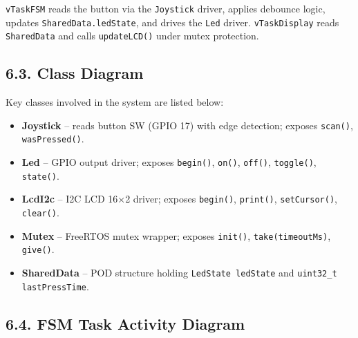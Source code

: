 \documentclass[12pt]{article}
\begin{document}
\texttt{vTaskFSM} reads the button via the \texttt{Joystick} driver, applies debounce logic, updates \texttt{SharedData.ledState}, and drives the \texttt{Led} driver. \texttt{vTaskDisplay} reads \texttt{SharedData} and calls \texttt{updateLCD()} under mutex protection.

\subsection*{6.3. Class Diagram}

Key classes involved in the system are listed below:

\begin{itemize}
    \item \textbf{Joystick} – reads button SW (GPIO 17) with edge detection; exposes \texttt{scan()}, \texttt{wasPressed()}.
    \item \textbf{Led} – GPIO output driver; exposes \texttt{begin()}, \texttt{on()}, \texttt{off()}, \texttt{toggle()}, \texttt{state()}.
    \item \textbf{LcdI2c} – I2C LCD 16×2 driver; exposes \texttt{begin()}, \texttt{print()}, \texttt{setCursor()}, \texttt{clear()}.
    \item \textbf{Mutex} – FreeRTOS mutex wrapper; exposes \texttt{init()}, \texttt{take(timeoutMs)}, \texttt{give()}.
    \item \textbf{SharedData} – POD structure holding \texttt{LedState ledState} and \texttt{uint32\_t lastPressTime}.
\end{itemize}

\subsection*{6.4. FSM Task Activity Diagram}
\end{document}
